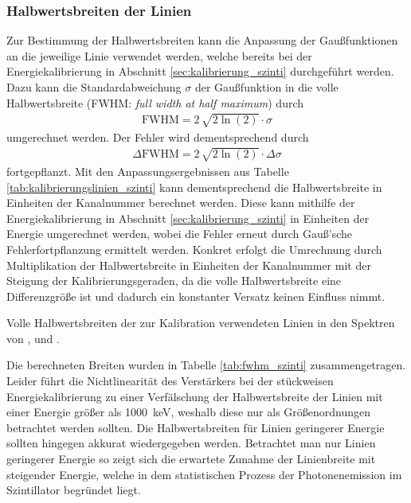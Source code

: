 \documentclass[11pt, a4paper]{article}
\numberwithin{equation}{section}
\begin{document}
\subsubsection{Halbwertsbreiten der Linien}
Zur Bestimmung der Halbwertsbreiten kann die Anpassung der Gaußfunktionen an die jeweilige Linie verwendet werden, welche bereits bei der Energiekalibrierung in Abschnitt \ref{sec:kalibrierung_szinti} durchgeführt werden.
Dazu kann die Standardabweichung $\sigma$ der Gaußfunktion in die volle Halbwertsbreite (FWHM: \textit{full width at half maximum}) durch
\begin{align}
	\text{FWHM} = 2 \, \sqrt{2\ln(2)} \cdot \sigma
\end{align}
umgerechnet werden.
Der Fehler wird dementsprechend durch
\begin{align}
	\Delta \text{FWHM} = 2 \, \sqrt{2\ln(2)} \cdot \Delta \sigma
\end{align}
fortgepflanzt.
Mit den Anpassungsergebnissen aus Tabelle \ref{tab:kalibrierungslinien_szinti} kann dementsprechend die Halbwertsbreite in Einheiten der Kanalnummer berechnet werden.
Diese kann mithilfe der Energiekalibrierung in Abschnitt \ref{sec:kalibrierung_szinti} in Einheiten der Energie umgerechnet werden, wobei die Fehler erneut durch Gauß'sche Fehlerfortpflanzung ermittelt werden.
Konkret erfolgt die Umrechnung durch Multiplikation der Halbwertsbreite in Einheiten der Kanalnummer mit der Steigung der Kalibrierungsgeraden, da die volle Halbwertsbreite eine Differenzgröße ist und dadurch ein konstanter Versatz keinen Einfluss nimmt.
\begin{table}[ht]
	\centering
	
	\caption{Volle Halbwertsbreiten der zur Kalibration verwendeten Linien in den Spektren von ,  und .}
	\label{tab:fwhm_szinti}
\end{table}
Die berechneten Breiten wurden in Tabelle \ref{tab:fwhm_szinti} zusammengetragen.
Leider führt die Nichtlinearität des Verstärkers bei der stückweisen Energiekalibrierung zu einer Verfälschung der Halbwertsbreite der Linien mit einer Energie größer als \SI{1000}{\kilo\electronvolt}, weshalb diese nur als Größenordnungen betrachtet werden sollten.
Die Halbwertsbreiten für Linien geringerer Energie sollten hingegen akkurat wiedergegeben werden.
Betrachtet man nur Linien geringerer Energie so zeigt sich die erwartete Zunahme der Linienbreite mit steigender Energie, welche in dem statistischen Prozess der Photonenemission im Szintillator begründet liegt.
\end{document}
